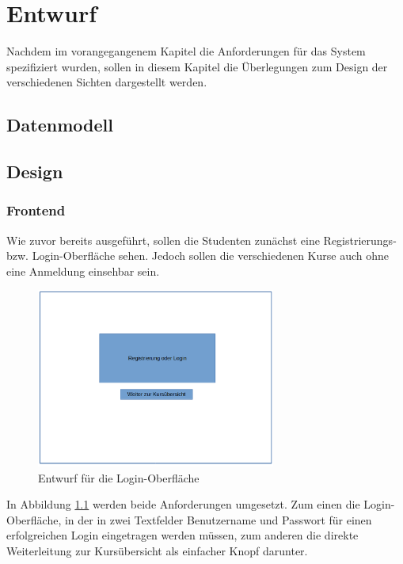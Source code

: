 \chapter{Entwurf}
    Nachdem im vorangegangenem Kapitel die Anforderungen für das System spezifiziert wurden, sollen in diesem Kapitel die Überlegungen zum Design der verschiedenen Sichten dargestellt werden.
    
    \section{Datenmodell}
    
    \section{Design}
        \subsection{Frontend}
            Wie zuvor bereits ausgeführt, sollen die Studenten zunächst eine Registrierungs- bzw. Login-Oberfläche sehen.
            Jedoch sollen die verschiedenen Kurse auch ohne eine Anmeldung einsehbar sein.
            \begin{figure}[t]
            	\centering
            	\includegraphics[width=0.7\textwidth]{./design/MockUpsFrontend/login.png}
            	\caption{Entwurf für die Login-Oberfläche}
            	\label{mockupLoginFrontend}
            \end{figure}
            In Abbildung \ref{mockupLoginFrontend} werden beide Anforderungen umgesetzt.
            Zum einen die Login-Oberfläche, in der in zwei Textfelder Benutzername und Passwort für einen erfolgreichen Login eingetragen werden müssen, zum anderen die direkte Weiterleitung zur Kursübersicht als einfacher Knopf darunter.
